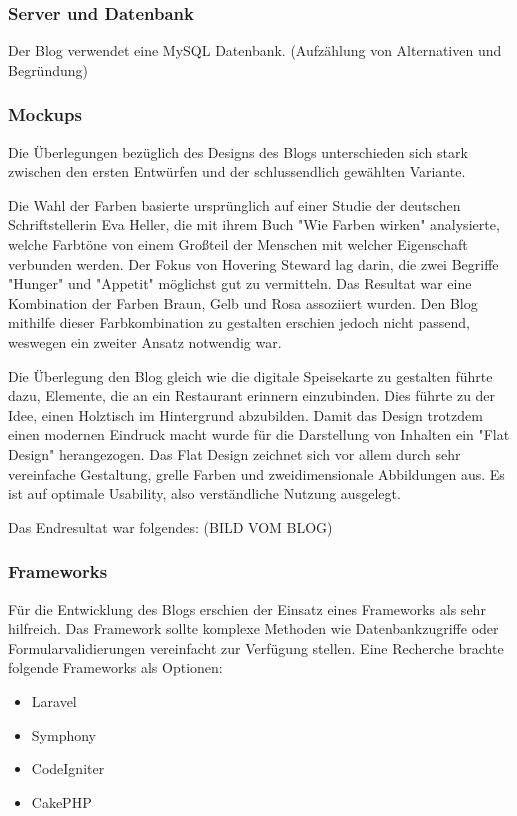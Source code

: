     \subsubsection{Server und Datenbank}
    Der Blog verwendet eine MySQL Datenbank. (Aufzählung von Alternativen und Begründung)
    \subsubsection{Mockups}
    Die Überlegungen bezüglich des Designs des Blogs unterschieden sich stark zwischen den ersten
    Entwürfen und der schlussendlich gewählten Variante.

    Die Wahl der Farben basierte ursprünglich auf einer Studie der deutschen Schriftstellerin Eva Heller,
    die mit ihrem Buch "Wie Farben wirken" analysierte, welche Farbtöne von einem Großteil der Menschen
    mit welcher Eigenschaft verbunden werden. Der Fokus von Hovering Steward lag darin, die zwei Begriffe {"Hunger"\cite{WieFarbenWirken}}
    und "Appetit" möglichst gut zu vermitteln. Das Resultat war eine Kombination der Farben Braun, Gelb und Rosa
    assoziiert wurden. Den Blog mithilfe dieser Farbkombination zu gestalten erschien jedoch nicht passend, weswegen
    ein zweiter Ansatz notwendig war.

    Die Überlegung den Blog gleich wie die digitale Speisekarte zu gestalten führte dazu, Elemente, die an ein Restaurant
    erinnern einzubinden. Dies führte zu der Idee, einen Holztisch im Hintergrund abzubilden.
    Damit das Design trotzdem einen modernen Eindruck macht wurde für die Darstellung von Inhalten ein {"Flat Design"\cite{FlatDesign}}
    herangezogen. Das Flat Design zeichnet sich vor allem durch sehr vereinfache Gestaltung, grelle Farben und zweidimensionale Abbildungen aus.
    Es ist auf optimale Usability, also verständliche Nutzung ausgelegt.

    Das Endresultat war folgendes:
    (BILD VOM BLOG)
    \subsubsection{Frameworks}
    Für die Entwicklung des Blogs erschien der Einsatz eines Frameworks als sehr hilfreich. Das Framework sollte komplexe Methoden wie
    Datenbankzugriffe oder Formularvalidierungen vereinfacht zur Verfügung stellen. Eine Recherche brachte folgende Frameworks als
    Optionen:
    \begin{itemize}
      \item Laravel
      \item Symphony
      \item CodeIgniter
      \item CakePHP
    \end{itemize}

